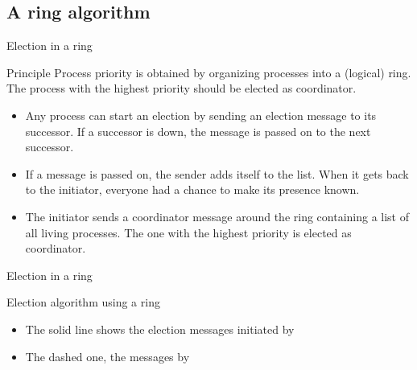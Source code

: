 \subsection{A ring algorithm}
\begin{frame}{Election in a ring}
  \begin{block}{Principle}
    Process priority is obtained by organizing processes into a (logical) ring. The process with the highest
    priority should be elected as coordinator.
    \begin{itemize}
      \item Any process can start an election by sending an election message to its successor. If a successor is
            down, the message is passed on to the next successor.
      \item If a message is passed on, the sender adds itself to the list. When it gets back to the initiator,
            everyone had a chance to make its presence known.
      \item The initiator sends a coordinator message around the ring containing a list of all living
            processes. The one with the highest priority is elected as coordinator.
    \end{itemize}
  \end{block}
\end{frame}
\begin{frame}{Election in a ring}
  \begin{block}{Election algorithm using a ring}
    \begin{center}
    \end{center}
    \begin{itemize}
      \item The solid line shows the election messages initiated by 
      \item The dashed one, the messages by 
    \end{itemize}
  \end{block}
\end{frame}
